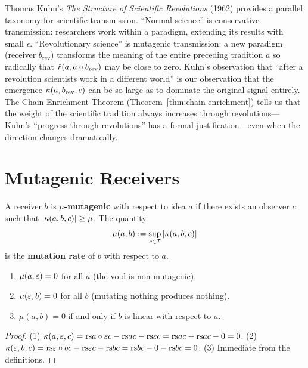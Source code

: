 \begin{remark}
\label{rem:ch9:kuhn_paradigm_transmission}
Thomas Kuhn's \emph{The Structure of Scientific Revolutions} (1962)
provides a parallel taxonomy for scientific transmission.  ``Normal science''
is conservative transmission: researchers work within a paradigm, extending
its results with small $\epsilon$.  ``Revolutionary science'' is mutagenic
transmission: a new paradigm (receiver $b_{\mathrm{rev}}$) transforms the
meaning of the entire preceding tradition $a$ so radically that
$\hat{r}(a, a \circ b_{\mathrm{rev}})$ may be close to zero.  Kuhn's
observation that ``after a revolution scientists work in a different world''
is our observation that the emergence $\kappa(a, b_{\mathrm{rev}}, c)$ can
be so large as to dominate the original signal entirely.  The Chain Enrichment
Theorem (Theorem~\ref{thm:chain-enrichment}) tells us that the weight of the
scientific tradition always increases through revolutions---Kuhn's ``progress
through revolutions'' has a formal justification---even when the direction
changes dramatically.
\end{remark}



\section{Mutagenic Receivers}

\begin{definition}
\label{def:mutagenic}
A receiver $b$ is \textbf{$\mu$-mutagenic} with respect to idea $a$ if there
exists an observer $c$ such that $|\kappa(a, b, c)| \geq \mu$.
The quantity
\[
  \mu(a, b) := \sup_{c \in \mathcal{I}} |\kappa(a, b, c)|
\]
is the \textbf{mutation rate} of $b$ with respect to $a$.
\end{definition}

\begin{proposition}
\label{prop:mutation-properties}
\begin{enumerate}
\item $\mu(a, \varepsilon) = 0$ for all $a$ (the void is non-mutagenic).
\item $\mu(\varepsilon, b) = 0$ for all $b$ (mutating nothing produces nothing).
\item $\mu(a, b) = 0$ if and only if $b$ is linear with respect to $a$.
\end{enumerate}
\end{proposition}

\begin{proof}
(1) $\kappa(a, \varepsilon, c) = \mathrm{rs}{a \circ \varepsilon}{c} - \mathrm{rs}{a}{c} - \mathrm{rs}{\varepsilon}{c}
   = \mathrm{rs}{a}{c} - \mathrm{rs}{a}{c} - 0 = 0$.
(2) $\kappa(\varepsilon, b, c) = \mathrm{rs}{\varepsilon \circ b}{c} - \mathrm{rs}{\varepsilon}{c} - \mathrm{rs}{b}{c}
   = \mathrm{rs}{b}{c} - 0 - \mathrm{rs}{b}{c} = 0$.
(3) Immediate from the definitions.
\end{proof}

